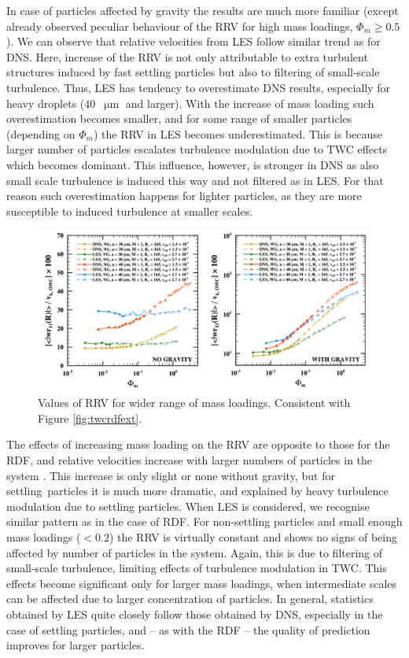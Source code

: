 \documentclass{pracamgren}
\begin{document}
In case of particles affected by gravity the results are much more familiar (except already observed peculiar behaviour of the RRV for high mass loadings, $\Phi_m  \ge 0.5$).
We can observe that relative velocities from LES follow similar trend as for DNS.
Here, increase of the RRV is not only attributable to extra turbulent structures induced by fast settling particles but also to filtering of small-scale turbulence.
Thus, LES has tendency to overestimate DNS results, especially for heavy droplets ($40$~$\upmu\text{m}$ and larger).
With the increase of mass loading such overestimation becomes smaller, and for some range of smaller particles (depending on $\Phi_m$) the RRV in LES becomes underestimated.
This is because larger number of particles escalates turbulence modulation due to TWC effects which becomes dominant.
This influence, however, is stronger in DNS as also small scale turbulence is induced this way and not filtered as in LES.
For that reason such overestimation happens for lighter particles, as they are more susceptible to induced turbulence at smaller scales.

\begin{figure}[h]
\centering
\includegraphics[width=13.5cm]{img/plots/2-2-3d-twcrrvext.pdf}
\caption{
Values of RRV for wider range of mass loadings.
Consistent with Figure \ref{fig:twcrdfext}.
}
\label{fig:twcrrvext}
\end{figure}

The effects of increasing mass loading on the RRV are opposite to those for the RDF, and relative velocities increase with larger numbers of particles in the system \parencite[Fig. 23 and 24]{Rosa2020}.
This increase is only slight or none without gravity, but for settling~particles it is much more dramatic, and explained by heavy turbulence modulation due to settling particles.
When LES is considered, we recognise similar pattern as in the case of RDF.
For non-settling particles and small enough mass loadings ($< 0.2$) the RRV is virtually constant and shows no signs of being affected by number of particles in the system.
Again, this is due to filtering of small-scale turbulence, limiting effects of turbulence modulation in TWC.
This effects become significant only for larger mass loadings, when intermediate scales can be affected due to larger concentration of particles.
In general, statistics obtained by LES quite closely follow those obtained by DNS, especially in the case of settling particles, and -- as with the RDF -- the quality of prediction improves for larger particles.  
 
\end{document}
